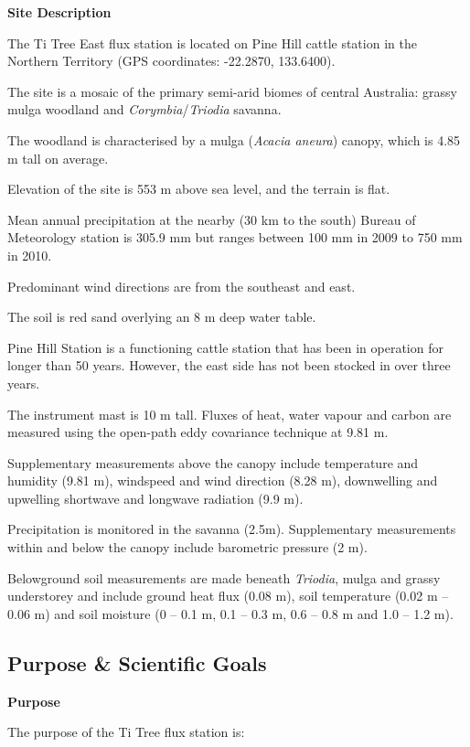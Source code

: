 \documentclass[11pt,a4paper]{article}
\begin{document}
\textbf{Site Description}

The Ti Tree East flux station is  located on Pine Hill cattle station in the Northern Territory (GPS coordinates: -22.2870, 133.6400).

The site is a mosaic of the primary  semi-arid biomes of central Australia: grassy mulga woodland and \textit{Corymbia}/\textit{Triodia} savanna.

The woodland is characterised by a mulga (\textit{Acacia aneura}) canopy, which is 4.85 m  tall on average.

Elevation of the site  is 553 m above sea level, and the terrain is flat.

Mean annual precipitation at the nearby (30 km  to the south) Bureau of Meteorology station is 305.9 mm but ranges between 100 mm  in 2009 to 750 mm in 2010.

Predominant  wind directions are from the southeast and east.

The soil is red sand overlying an 8 m deep  water table.

Pine Hill Station is a  functioning cattle station that has been in operation for longer than 50 years. However, the east side has not been stocked  in over three years.

The instrument mast is 10 m  tall. Fluxes of heat, water vapour and  carbon are measured using the open-path eddy covariance technique at 9.81 m.

Supplementary measurements above the canopy  include temperature and humidity (9.81 m), windspeed and wind direction (8.28 m),  downwelling and upwelling shortwave and longwave radiation (9.9 m).

Precipitation is monitored in the savanna  (2.5m). Supplementary measurements  within and below the canopy include barometric pressure (2 m).

Belowground soil measurements are made beneath \textit{Triodia}, mulga and grassy understorey  and include ground heat flux (0.08 m), soil temperature (0.02 m – 0.06 m) and  soil moisture (0 – 0.1 m, 0.1 – 0.3 m, 0.6 – 0.8 m and 1.0 – 1.2 m).

\subsection*{Purpose \& Scientific Goals}

\textbf{Purpose}

The  purpose of the Ti Tree  flux station is:
\end{document}
